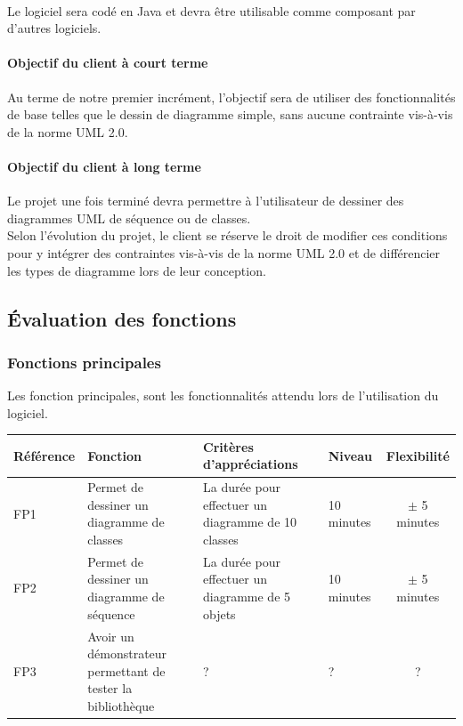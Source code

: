 \documentclass[12pt,a4paper,openany]{article}
\begin{document}
	\paragraph{}
		Le logiciel sera codé en Java et devra être utilisable comme composant par d'autres logiciels.\\
	\paragraph{Objectif du client à court terme} Au terme de notre premier incrément, l'objectif sera
	de utiliser des fonctionnalités de base telles que le dessin de diagramme simple, sans aucune
	contrainte vis-à-vis de la norme UML 2.0.
	\paragraph{Objectif du client à long terme}
	Le projet une fois terminé devra permettre à l'utilisateur de dessiner des diagrammes UML de séquence ou de classes.\\
	Selon l'évolution du projet, le client se réserve le droit de modifier ces conditions pour y
	intégrer des contraintes vis-à-vis de la norme UML 2.0 et de différencier les types de diagramme lors de leur conception. 
	
	\subsection{Évaluation des fonctions}
	\subsubsection{Fonctions principales}
	Les fonction principales, sont les fonctionnalités attendu lors de l'utilisation du logiciel.\\ 
	\begin{tabular}{|p{2cm}|p{3cm}|p{5cm}|p{3cm}|c|}
		\hline
		\textbf{Référence}& \textbf{Fonction} & \textbf{Critères d'appréciations} & \textbf{Niveau} & \textbf{Flexibilité} \\
		\hline
			FP1 & Permet de dessiner un diagramme de classes & La durée pour effectuer un diagramme de 10 classes & 10 minutes & $\pm$ 5 minutes\\
		\hline
			FP2 & Permet de dessiner un diagramme de séquence & La durée pour effectuer un diagramme de 5 objets & 10 minutes & $\pm$ 5 minutes\\
		\hline
			FP3 & Avoir un démonstrateur permettant de tester la bibliothèque & ? & ? & ? \\
		\hline
	\end{tabular}
\end{document}
